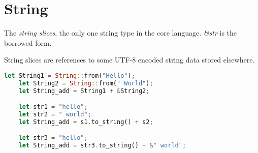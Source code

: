 \section{String}
\begin{definition}[str]
	The \emph{string slices}, the only one string type in the core language.
	\emph{\&str} is the borrowed form.
\end{definition}

String slices are references to some UTF-8 encoded string data stored elsewhere.

\begin{lstlisting}[language=rust, style=boxed]
	let String1 = String::from("Hello");
	let String2 = String::from(" World");
	let String_add = String1 + &String2;

	let str1 = "hello";
	let str2 = " world";
	let String_add = s1.to_string() + s2;

	let str3 = "hello";
	let String_add = str3.to_string() + &" world";
\end{lstlisting}

